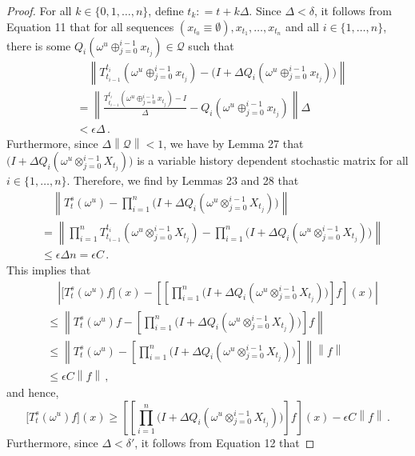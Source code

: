 \documentclass[a4paper,reqno]{amsart}
\newcommand{\norm}[1]{\left\lVert #1 \right\rVert}
\newcommand{\coloneqq}{:\!=}
\begin{document}
\begin{proof}
For all $k\in\{0,1,\ldots,n\}$, define $t_k\coloneqq t+k\Delta$. Since $\Delta<\delta$, it follows from Equation 11 that for all sequences $(x_{t_0}\equiv\emptyset),x_{t_1},\ldots,x_{t_n}$ and all $i\in\{1,\ldots,n\}$, there is some $Q_i(\omega^u\oplus_{j=0}^{i-1}x_{t_j})\in\mathcal{Q}$ such that
\begin{align*}
&\quad \norm{T_{t_{i-1}}^{t_i}(\omega^u\oplus_{j=0}^{i-1}x_{t_j}) - \bigl(I+\Delta Q_i(\omega^u\oplus_{j=0}^{i-1}x_{t_j})\bigr)} \\
 &= \norm{\frac{T_{t_{i-1}}^{t_i}(\omega^u\oplus_{j=0}^{i-1}x_{t_j}) - I}{\Delta} - Q_i(\omega^u\oplus_{j=0}^{i-1}x_{t_j})}\Delta \\
 &< \epsilon\Delta\,.
\end{align*}
Furthermore, since $\Delta\norm{\mathcal{Q}}<1$, we have by Lemma 27 that $\bigl(I + \Delta Q_i(\omega^u\otimes_{j=0}^{i-1}X_{t_j})\bigr)$ is a variable history dependent stochastic matrix for all $i\in\{1,\ldots,n\}$. Therefore, we find by Lemmas 23 and 28 that
\begin{align*}
&\quad \norm{T_t^s(\omega^u) - \prod_{i=1}^n\bigl(I + \Delta Q_i(\omega^u\otimes_{j=0}^{i-1}X_{t_j})\bigr)} \\
 &= \norm{\prod_{i=1}^n T_{t_{i-1}}^{t_i}(\omega^u\otimes_{j=0}^{i-1}X_{t_j}) - \prod_{i=1}^n\bigl(I + \Delta Q_i(\omega^u\otimes_{j=0}^{i-1}X_{t_j})\bigr)} \\
 &\leq \epsilon\Delta n = \epsilon C\,.
\end{align*}
This implies that
\begin{align*}
&\quad\left\vert \bigl[T_t^s(\omega^u)f\bigr](x) - \left[\left[\prod_{i=1}^n\bigl(I + \Delta Q_i(\omega^u\otimes_{j=0}^{i-1}X_{t_j})\bigr) \right]f\right](x) \right\vert \\
 &\leq \norm{T_t^s(\omega^u)f - \left[\prod_{i=1}^n\bigl(I + \Delta Q_i(\omega^u\otimes_{j=0}^{i-1}X_{t_j})\bigr) \right]f} \\
 &\leq \norm{T_t^s(\omega^u) - \left[\prod_{i=1}^n\bigl(I + \Delta Q_i(\omega^u\otimes_{j=0}^{i-1}X_{t_j})\bigr) \right]}\norm{f} \\
 &\leq \epsilon C\norm{f}\,,
\end{align*}
and hence,
\begin{equation}
\bigl[T_t^s(\omega^u)f\bigr](x) \geq \left[\left[\prod_{i=1}^n\bigl(I + \Delta Q_i(\omega^u\otimes_{j=0}^{i-1}X_{t_j})\bigr) \right]f\right](x) - \epsilon C\norm{f}\,.
\end{equation}
Furthermore, since $\Delta<\delta'$, it follows from Equation 12 that

\end{proof}
\end{document}

